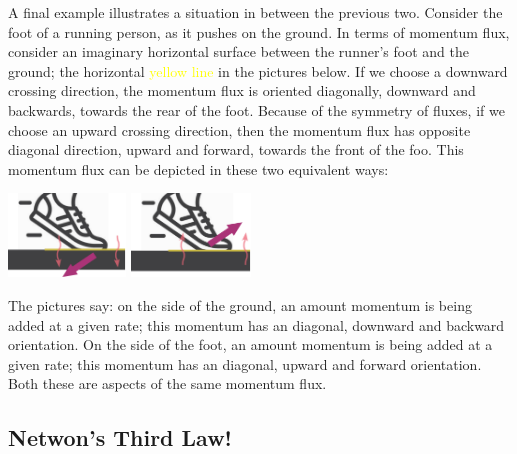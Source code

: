 \documentclass[a4paper,12pt,%
onecolumn,oneside,%
british%
]{memoir}
\renewcommand*{\|}[1][]{\nonscript\:#1\vert\nonscript\:\mathopen{}}
\begin{document}
A final example illustrates a situation in between the previous two. Consider the foot of a running person, as it pushes on the ground. In terms of momentum flux, consider an imaginary horizontal surface between the runner's foot and the ground; the horizontal \textcolor{yellow}{yellow line} in the pictures below. If we choose a downward crossing direction, the momentum flux is oriented diagonally, downward and backwards, towards the rear of the foot. Because of the symmetry of fluxes, if we choose an upward crossing direction, then the momentum flux has opposite diagonal direction, upward and forward, towards the front of the foo. This momentum flux can be depicted in these two equivalent ways:\noprelistbreak
\begin{center}
  \medskip
\hspace*{\fill}
  \includegraphics[height=6em]{images/foot_shear_flux_down.pdf}
\hfill
  \includegraphics[height=6em]{images/foot_shear_flux_up.pdf}
\hspace*{\fill}
\end{center}
The pictures say: on the side of the ground, an amount momentum is being added at a given rate; this momentum has an diagonal, downward and backward orientation. On the side of the foot, an amount momentum is being added at a given rate; this momentum has an diagonal, upward and forward orientation. Both these are aspects of the same momentum flux.

\subsection{Netwon's Third Law!}
\label{sec:newton_3rd}
\end{document}
